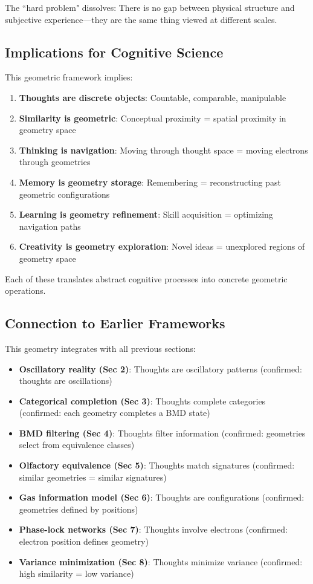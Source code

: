 \documentclass[12pt,a4paper]{article}
\begin{document}
The ``hard problem" dissolves: There is no gap between physical structure and subjective experience—they are the same thing viewed at different scales.

\subsection{Implications for Cognitive Science}

This geometric framework implies:

\begin{enumerate}
\item \textbf{Thoughts are discrete objects}: Countable, comparable, manipulable
\item \textbf{Similarity is geometric}: Conceptual proximity = spatial proximity in geometry space
\item \textbf{Thinking is navigation}: Moving through thought space = moving electrons through geometries
\item \textbf{Memory is geometry storage}: Remembering = reconstructing past geometric configurations
\item \textbf{Learning is geometry refinement}: Skill acquisition = optimizing navigation paths
\item \textbf{Creativity is geometry exploration}: Novel ideas = unexplored regions of geometry space
\end{enumerate}

Each of these translates abstract cognitive processes into concrete geometric operations.

\subsection{Connection to Earlier Frameworks}

This geometry integrates with all previous sections:

\begin{itemize}
\item \textbf{Oscillatory reality (Sec 2)}: Thoughts are oscillatory patterns (confirmed: thoughts are  oscillations)
\item \textbf{Categorical completion (Sec 3)}: Thoughts complete categories (confirmed: each geometry completes a BMD state)
\item \textbf{BMD filtering (Sec 4)}: Thoughts filter information (confirmed: geometries select from equivalence classes)
\item \textbf{Olfactory equivalence (Sec 5)}: Thoughts match signatures (confirmed: similar geometries = similar signatures)
\item \textbf{Gas information model (Sec 6)}: Thoughts are  configurations (confirmed: geometries defined by  positions)
\item \textbf{Phase-lock networks (Sec 7)}: Thoughts involve electrons (confirmed: electron position defines geometry)
\item \textbf{Variance minimization (Sec 8)}: Thoughts minimize variance (confirmed: high similarity = low variance)
\end{itemize}
\end{document}
